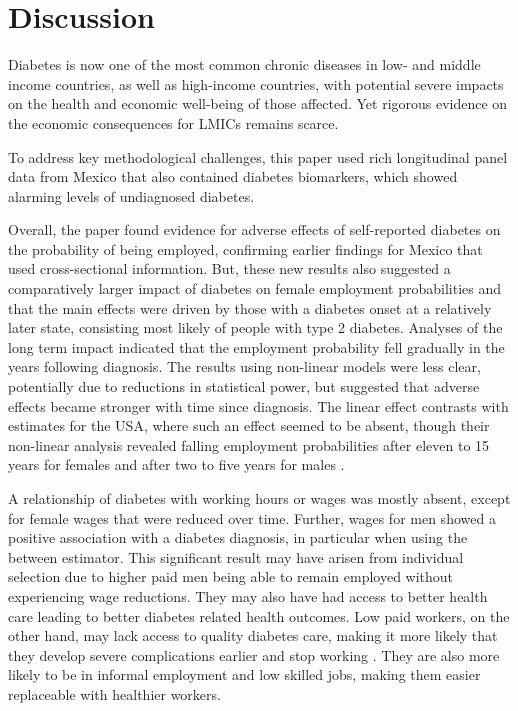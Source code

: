 \documentclass[12pt,english]{article}
\begin{document}
\FloatBarrier
	
\section{\label{sec:cha_4_conclusion}Discussion}

Diabetes is now one of the most common chronic diseases in low- and middle income countries, as well as high-income countries, with potential severe impacts on the health and economic well-being of those affected.  Yet rigorous evidence on the economic consequences for \acp{LMIC} remains scarce.

To address key methodological challenges, this paper used rich longitudinal panel data from Mexico that also contained diabetes biomarkers, which showed alarming levels of undiagnosed diabetes.

Overall, the paper found evidence for adverse effects of self-reported diabetes on the probability of being employed, confirming earlier findings for Mexico that used cross-sectional information. But, these new results also suggested a comparatively larger impact of diabetes on female employment probabilities and that the main effects were driven by those with a diabetes onset at a relatively later state, consisting most likely of people with type 2 diabetes. Analyses of the long term impact indicated that the employment probability fell gradually in the years following diagnosis. The results using non-linear models were less clear, potentially due to reductions in statistical power, but suggested that adverse effects became stronger with time since diagnosis. The linear effect contrasts with estimates for the USA, where such an effect seemed to be absent, though their non-linear analysis revealed falling employment probabilities after eleven to 15 years for females and after two to five years for males \parencite{Minor2013}. 

A relationship of diabetes with working hours or wages was mostly absent, except for female wages that were reduced over time. Further, wages for men showed a positive association with a diabetes diagnosis, in particular when using the between estimator. This significant result may have arisen from individual selection due to higher paid men being able to remain employed without experiencing wage reductions. They may also have had access to better health care leading to better diabetes related health outcomes. Low paid workers, on the other hand, may lack access to quality diabetes care, making it more likely that they develop severe complications earlier and stop working \parencite{Flores-Hernandez2015}. They are also more likely to be in informal employment and low skilled jobs, making them easier replaceable with healthier workers.
\end{document}
